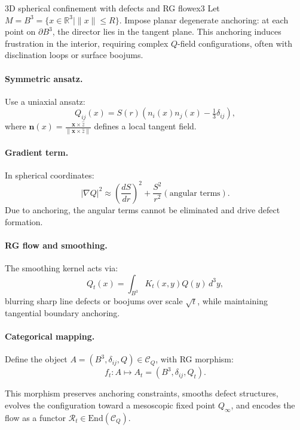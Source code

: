	\begin{example}{3D spherical confinement with defects and RG flow}{ex3}
		Let \( M = B^3 = \{ x \in \mathbb{R}^3 \mid \|x\| \leqslant R \} \). Impose planar degenerate anchoring: at each point on \( \partial B^3 \), the director lies in the tangent plane. This anchoring induces frustration in the interior, requiring complex \( Q \)-field configurations, often with disclination loops or surface boojums.
		
		\paragraph{Symmetric ansatz.}
		Use a uniaxial ansatz:
		\[
		Q_{ij}(x) = S(r) \left( n_i(x) n_j(x) - \tfrac{1}{3} \delta_{ij} \right),
		\]
		where \( \mathbf{n}(x) = \frac{\mathbf{x} \times \hat{z}}{\|\mathbf{x} \times \hat{z}\|} \) defines a local tangent field.
		
		\paragraph{Gradient term.}
		In spherical coordinates:
		\[
		|\nabla Q|^2 \approx \left( \frac{dS}{dr} \right)^2 + \frac{S^2}{r^2} \left( \text{angular terms} \right).
		\]
		Due to anchoring, the angular terms cannot be eliminated and drive defect formation.
		
		\paragraph{RG flow and smoothing.}
		The smoothing kernel acts via:
		\[
		Q_t(x) = \int_{B^3} K_t(x,y) Q(y)\, d^3y,
		\]
		blurring sharp line defects or boojums over scale \( \sqrt{t} \), while maintaining tangential boundary anchoring.
		
		\paragraph{Categorical mapping.}
		Define the object \( A = (B^3, \delta_{ij}, Q) \in \mathcal{C}_Q \), with RG morphism:
		\[
		f_t: A \mapsto A_t = (B^3, \delta_{ij}, Q_t).
		\]
		
		This morphism preserves anchoring constraints, smooths defect structures, evolves the configuration toward a mesoscopic fixed point \( Q_\infty \), and encodes the flow as a functor \( \mathcal{R}_t \in \mathrm{End}(\mathcal{C}_Q) \).
	\end{example}
	
